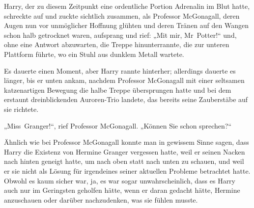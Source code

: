 Harry, der zu diesem Zeitpunkt eine ordentliche Portion Adrenalin im Blut hatte, schreckte auf und zuckte sichtlich zusammen, als Professor McGonagall, deren Augen nun vor unmöglicher Hoffnung glühten und deren Tränen auf den Wangen schon halb getrocknet waren, aufsprang und rief: „Mit mir, Mr~Potter!“ und, ohne eine Antwort abzuwarten, die Treppe hinunterrannte, die zur unteren Plattform führte, wo ein Stuhl aus dunklem Metall wartete.

Es dauerte einen Moment, aber Harry rannte hinterher; allerdings dauerte es länger, bis er unten ankam, nachdem Professor McGonagall mit einer seltsamen katzenartigen Bewegung die halbe Treppe übersprungen hatte und bei dem erstaunt dreinblickenden Auroren-Trio landete, das bereits seine Zauberstäbe auf sie richtete.

„Miss~Granger!“, rief Professor McGonagall. „Können Sie schon sprechen?“

Ähnlich wie bei Professor McGonagall konnte man in gewissem Sinne sagen, dass Harry die Existenz von Hermine Granger vergessen hatte, weil er seinen Nacken nach hinten geneigt hatte, um nach oben statt nach unten zu schauen, und weil er sie nicht als Lösung für irgendeines seiner aktuellen Probleme betrachtet hatte. Obwohl es kaum sicher war, ja, es war sogar unwahrscheinlich, dass es Harry auch nur im Geringsten geholfen hätte, wenn er daran gedacht hätte, Hermine anzuschauen oder darüber nachzudenken, was sie fühlen musste.

